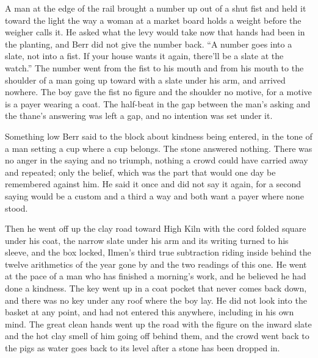 A man at the edge of the rail brought a number up out of a shut fist and held it toward the light the way a woman at a market board holds a weight before the weigher calls it. He asked what the levy would take now that hands had been in the planting, and Berr did not give the number back. “A number goes into a slate, not into a fist. If your house wants it again, there'll be a slate at the watch.” The number went from the fist to his mouth and from his mouth to the shoulder of a man going up toward  with a slate under his arm, and arrived nowhere. The boy gave the fist no figure and the shoulder no motive, for a motive is a payer wearing a coat. The half-beat in the gap between the man's asking and the thane's answering was left a gap, and no intention was set under it.

Something low Berr said to the block about kindness being entered, in the tone of a man setting a cup where a cup belongs. The stone answered nothing. There was no anger in the saying and no triumph, nothing a crowd could have carried away and repeated; only the belief, which was the part that would one day be remembered against him. He said it once and did not say it again, for a second saying would be a custom and a third a way and both want a payer where none stood.

Then he went off up the clay road toward High Kiln with the cord folded square under his coat, the narrow slate under his arm and its writing turned to his sleeve, and the box locked, Ilmen's third true subtraction riding inside behind the twelve arithmetics of the year gone by and the two readings of this one. He went at the pace of a man who has finished a morning's work, and he believed he had done a kindness. The key went up in a coat pocket that never comes back down, and there was no key under any roof where the boy lay. He did not look into the basket at any point, and had not entered this anywhere, including in his own mind. The great clean hands went up the road with the figure on the inward slate and the hot clay smell of him going off behind them, and the crowd went back to the pigs as water goes back to its level after a stone has been dropped in.

